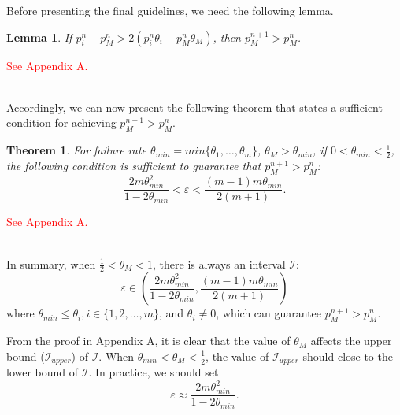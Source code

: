 \documentclass[10pt,journal,compsoc]{IEEEtran}
\begin{document}
Before presenting the final guidelines, we need the following lemma.
\newtheorem{lem}{Lemma}
\label{Lemma}
\begin{lem}
  If $p_i^{n} - p_M^{n} > 2(p_i^{n}\theta_i - p_M^{n}\theta_M)$, then $p_M^{n + 1} > p_M^{n}$.
\end{lem}
\begin{IEEEproof}
\textcolor{red}{See Appendix A.}
\end{IEEEproof}
~\\
Accordingly, we can now present the following theorem that states a sufficient condition for achieving $p_M^{n + 1} > p_M^{n}$.
\newtheorem{theo}{Theorem}
\label{theorem}
\begin{theo}
  For failure rate $\theta_{min} = min\{\theta_1, \ldots, \theta_m\}$, $\theta_M > \theta_{min}$, if $0 < \theta_{min} < \frac{1}{2}$, the following condition is sufficient to guarantee that $p_M^{n + 1} > p_M^{n}$:
\begin{equation}
\label{equa:results}
  \displaystyle\frac{2m\theta_{min}^2}{1-2\theta_{min}} < \varepsilon < \displaystyle\frac{(m-1)m\theta_{min}}{2(m + 1)}.
\end{equation}
\end{theo}
\begin{IEEEproof}
\textcolor{red}{See Appendix A.}
\end{IEEEproof}
~\\
In summary, when $\frac{1}{2} < \theta_M < 1$, there is always an interval $\mathcal{I}$:
\begin{equation}
  \varepsilon \in (\displaystyle\frac{2m\theta_{min}^2}{1 - 2\theta_{min}}, \displaystyle\frac{(m - 1)m\theta_{min}}{2(m + 1)})
\end{equation}
where $\theta_{min} \le \theta_i, i \in \{1, 2, \ldots, m\}$, and $\theta_i \ne 0$, which can guarantee $p_M^{n+1} > p_M^n$.

From the proof in Appendix A, it is clear that the value of $\theta_M$ affects the upper bound ($\mathcal{I}_{upper}$) of $\mathcal{I}$.
When $\theta_{min} < \theta_M < \frac{1}{2}$, the value of $\mathcal{I}_{upper}$ should close to the lower bound of $\mathcal{I}$.
In practice, we should set
\begin{equation}
\label{euqtion:approxValue}
  \varepsilon \approx \frac{2m\theta_{min}^2}{1-2\theta_{min}}.
\end{equation}
\end{document}
